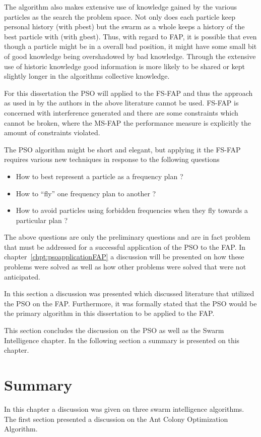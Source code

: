 The algorithm also makes extensive use of knowledge gained by the various particles as the search the problem space. Not only does each particle keep personal history (with pbest) but the swarm as a whole keeps a history of the best particle with (with gbest). Thus, with regard to FAP, it is possible that even though a particle might be in a overall bad position, it might have some small bit of good knowledge being overshadowed by bad knowledge. Through the extensive use of historic knowledge good information is more likely to be shared or kept slightly longer in the algorithms collective knowledge.

For this dissertation the PSO will applied to the FS-FAP and thus the approach as used in by the authors in the above literature cannot be used. FS-FAP is concerned with interference generated and there are some constraints which cannot be broken, where the MS-FAP the performance measure is explicitly the amount of constraints violated.

The PSO algorithm might be short and elegant, but applying it the FS-FAP requires various new techniques in response to the following questions
\begin{itemize}
\item How to best represent a particle as a frequency plan ?
\item How to ``fly'' one frequency plan to another ?
\item How to avoid particles using forbidden frequencies when they fly towards a particular plan ?
\end{itemize}

The above questions are only the preliminary questions and are in fact problem that must be addressed for a successful application of the PSO to the FAP. In chapter~\ref{chpt:psoapplicationFAP} a discussion will be presented on how these problems were solved as well as how other problems were solved that were not anticipated.

In this section a discussion was presented which discussed literature that utilized the PSO on the FAP. Furthermore, it was formally stated that the PSO would be the primary algorithm in this dissertation to be applied to the FAP.

This section concludes the discussion on the PSO as well as the Swarm Intelligence chapter. In the following section a summary is presented on this chapter.
\section{Summary}
In this chapter a discussion was given on three swarm intelligence algorithms. The first section presented a discussion on the Ant Colony Optimization Algorithm.

